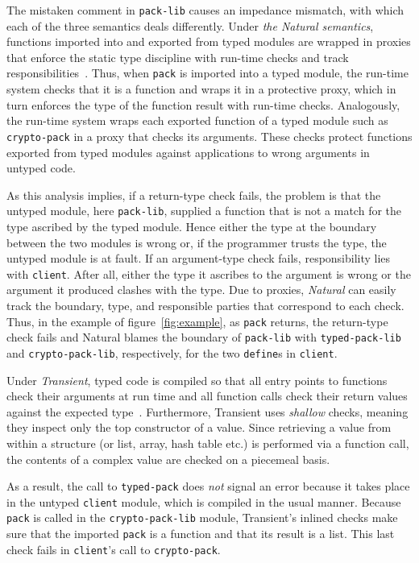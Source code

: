 The mistaken comment in {\tt pack-lib} causes an impedance mismatch, with which each
of the three semantics deals differently.  Under {\it the Natural semantics\/},
functions imported into and exported from typed modules are wrapped in proxies that
enforce the static type discipline with run-time checks and track
responsibilities~\citep{tf-popl-2008, tfffgksst-snapl-2017}. Thus, when {\tt pack}
is imported into a typed module, the run-time system checks that it is a function
and wraps it in a protective proxy, which in turn enforces the type of the function
result with run-time checks.  Analogously, the run-time system wraps each exported
function of a typed module such as {\tt crypto-pack} in a proxy that checks its
arguments.  These checks protect functions exported from typed modules against
applications to wrong arguments in untyped code.

As this analysis implies, if a return-type check fails, the problem is
that the untyped module, here {\tt pack-lib}, supplied a function that is not a
match for the type ascribed by the typed module.
Hence either the type at the boundary between the two modules is wrong or, 
if the programmer trusts the type, the untyped module is at fault.
If an argument-type check fails, responsibility  lies with
{\tt client}. After all, either the type it ascribes to the argument is
wrong or the argument it produced clashes with the type. Due to 
proxies, {\it Natural\/} can easily track the 
boundary, type, and responsible parties that correspond to each check. 
Thus, in the example of figure~\ref{fig:example}, as
\texttt{pack} returns, the return-type check fails and Natural blames
the boundary of \texttt{pack-lib} with {\tt typed-pack-lib} and
{\tt crypto-pack-lib}, respectively, for the two {\tt define}s in {\tt client}.

Under {\it Transient\/}, typed code is compiled so that all entry points to
functions check their arguments at run time and all function calls check their
return values against the expected type~\citep{vss-popl-2017}.  Furthermore,
Transient uses \emph{shallow} checks, meaning they inspect only the top
constructor of a value. Since retrieving a value from within a structure (or
list, array, hash table etc.) is performed via a function call, the contents of
a complex value are checked on a piecemeal basis.

As a result, the call to \texttt{typed-pack} does {\em not\/} signal an error
because it takes place in the untyped {\tt client} module, which is compiled in
the usual manner. Because {\tt pack} is called in the {\tt crypto-pack-lib}
module, Transient's inlined checks make sure that the imported
\texttt{pack} is a function and that its result is a list. This
last check fails in \texttt{client}'s call to {\tt crypto-pack}.

